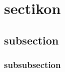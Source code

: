 \documentclass[
10pt, %
english, %
singlespacing, %
liststotoc, %
toctotoc, %
headsepline, %
]{skripsiSTKIP} %
\begin{document}



%



\tableofcontents %

\listoffigures %

\listoftables %





\mainmatter %

\pagestyle{thesis} %



\section{sectikon}
\subsection{subsection}
\subsubsection{subsubsection}







\appendix %



%
%


\printbibliography[heading=bibintoc]

\end{document}

